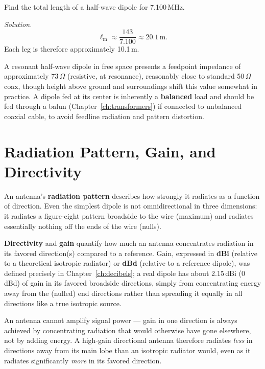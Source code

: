 \begin{examplebox}
Find the total length of a half-wave dipole for 7.100\,MHz.

\emph{Solution.}
\[
\ell_{\text{m}} \approx \frac{143}{7.100} \approx 20.1\,\text{m}.
\]
Each leg is therefore approximately 10.1\,m.
\end{examplebox}

A resonant half-wave dipole in free space presents a feedpoint
impedance of approximately $73\,\Omega$ (resistive, at resonance),
reasonably close to standard 50\,$\Omega$ coax, though height above
ground and surroundings shift this value somewhat in practice. A dipole
fed at its center is inherently a \textbf{balanced} load and should be
fed through a balun (Chapter~\ref{ch:transformers}) if connected to
unbalanced coaxial cable, to avoid feedline radiation and pattern
distortion.

\section{Radiation Pattern, Gain, and Directivity}

An antenna's \textbf{radiation pattern} describes how strongly it
radiates as a function of direction. Even the simplest dipole is not
omnidirectional in three dimensions: it radiates a figure-eight pattern
broadside to the wire (maximum) and radiates essentially nothing off the
ends of the wire (nulls).

\textbf{Directivity} and \textbf{gain} quantify how much an antenna
concentrates radiation in its favored direction(s) compared to a
reference. Gain, expressed in \textbf{dBi} (relative to a theoretical
isotropic radiator) or \textbf{dBd} (relative to a reference dipole),
was defined precisely in Chapter~\ref{ch:decibels}; a real dipole has
about 2.15\,dBi (0\,dBd) of gain in its favored broadside directions,
simply from concentrating energy away from the (nulled) end directions
rather than spreading it equally in all directions like a true
isotropic source.

\begin{keyidea}
An antenna cannot amplify signal power --- gain in one direction is
always achieved by concentrating radiation that would otherwise have
gone elsewhere, not by adding energy. A high-gain directional antenna
therefore radiates \emph{less} in directions away from its main lobe
than an isotropic radiator would, even as it radiates significantly
\emph{more} in its favored direction.
\end{keyidea}

